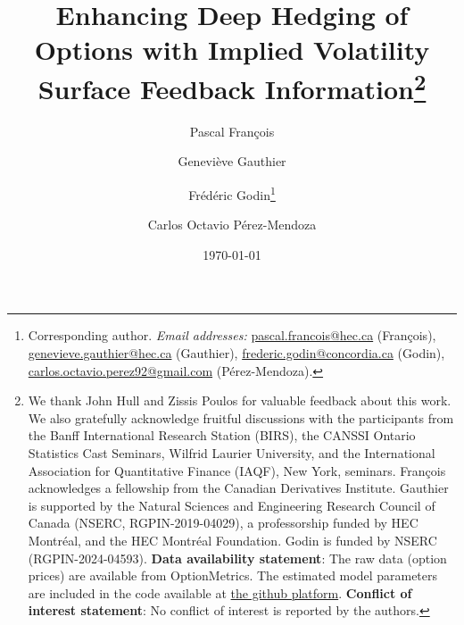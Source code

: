 \documentclass[12pt]{article}
\begin{document}
\title{\Large \bfseries Enhancing Deep Hedging of Options with Implied Volatility Surface Feedback Information\thanks{\footnotesize  We thank John Hull and Zissis Poulos for valuable feedback about this work. We also gratefully acknowledge fruitful discussions with the participants from the Banff International Research Station (BIRS), the CANSSI Ontario Statistics Cast Seminars, Wilfrid Laurier University, and the International Association for Quantitative Finance (IAQF), New York, seminars. Fran\c cois acknowledges a fellowship from the Canadian Derivatives Institute. Gauthier is supported by the Natural Sciences and Engineering Research Council of Canada (NSERC, RGPIN-2019-04029), a professorship funded by HEC Montr\'eal, and the HEC Montr\'eal Foundation. Godin is funded by NSERC (RGPIN-2024-04593). \textbf{Data availability statement}: The raw data (option prices) are available from OptionMetrics. The estimated model parameters are included in the code available at \href{https://github.com/cpmendoza/DeepHedging_JIVR.git}{the github platform}. \textbf{Conflict of interest statement}: No conflict of interest is reported by the authors.}} 

\author[a]{Pascal Fran\c cois}
\author[b]{Genevi\`eve Gauthier}
\author[c]{Fr\'ed\'eric Godin\thanks{Corresponding author.
{ \it Email addresses:} 
\href{mailto:pascal.francois@hec.ca}{pascal.francois@hec.ca} (François),
\href{mailto:genevieve.gauthier@hec.ca}{genevieve.gauthier@hec.ca} (Gauthier), \href{mailto:frederic.godin@concordia.ca}{frederic.godin@concordia.ca} (Godin), \href{mailto:carlos.octavio.perez92@gmail.com}{carlos.octavio.perez92@gmail.com} (P\'erez-Mendoza).}} 
\author[c]{Carlos Octavio P\'erez-Mendoza} 




\vspace{-30pt}
\date{ \today}


\maketitle \thispagestyle{empty} %
\end{document}

